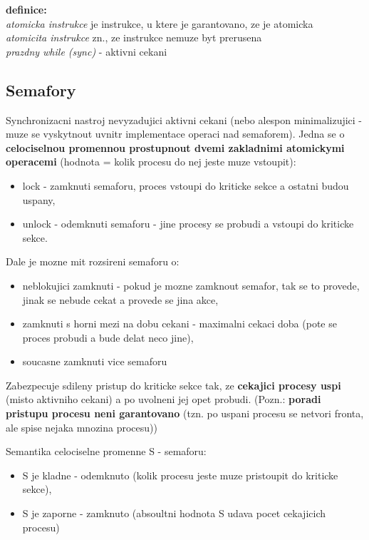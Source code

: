 \documentclass[a4paper, 11pt]{article}
\begin{document}
\textbf{definice:} \\[0.5em]
\textit{atomicka instrukce} je instrukce, u ktere je garantovano, ze je atomicka \\[0.2em]
\textit{atomicita instrukce} zn., ze instrukce nemuze byt prerusena \\[0.2em]
\textit{prazdny while (sync)} - aktivni cekani \\

\newpage

\subsection{Semafory}
Synchronizacni nastroj nevyzadujici aktivni cekani (nebo alespon minimalizujici - muze se vyskytnout uvnitr implementace operaci nad semaforem). Jedna se o \textbf{celociselnou promennou prostupnout dvemi zakladnimi atomickymi operacemi} (hodnota = kolik procesu do nej jeste muze vstoupit):
\begin{itemize}
    \item lock - zamknuti semaforu, proces vstoupi do kriticke sekce a ostatni budou uspany,
    \item unlock - odemknuti semaforu - jine procesy se probudi a vstoupi do kriticke sekce. \\
\end{itemize}

Dale je mozne mit rozsireni semaforu o:
\begin{itemize}
    \item neblokujici zamknuti - pokud je mozne zamknout semafor, tak se to provede, jinak se nebude cekat a provede se jina akce,
    \item zamknuti s horni mezi na dobu cekani - maximalni cekaci doba (pote se proces probudi a bude delat neco jine),
    \item soucasne zamknuti vice semaforu \\
\end{itemize}

Zabezpecuje sdileny pristup do kriticke sekce tak, ze \textbf{cekajici procesy uspi} (misto aktivniho cekani) a po uvolneni jej opet probudi. (Pozn.: \textbf{poradi pristupu procesu neni garantovano} (tzn. po uspani procesu se netvori fronta, ale spise nejaka mnozina procesu))

Semantika celociselne promenne S - semaforu:
\begin{itemize}
    \item S je kladne - odemknuto (kolik procesu jeste muze pristoupit do kriticke sekce),
    \item S je zaporne - zamknuto (absoultni hodnota S udava pocet cekajicich procesu) \\
\end{itemize}
\end{document}
